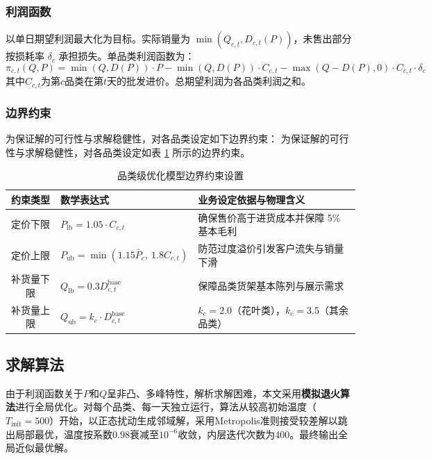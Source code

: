 \documentclass[withoutpreface]{cumcmthesis}
\begin{document}
\subsubsection{利润函数}

以单日期望利润最大化为目标。实际销量为 $\min(Q_{c,t}, D_{c,t}(P))$，未售出部分按损耗率 $\delta_c$ 承担损失。单品类利润函数为：
\begin{equation}
\pi_{c,t}(Q,P) = \min(Q,D(P))\cdot P - \min(Q,D(P))\cdot C_{c,t} - \max(Q-D(P),0)\cdot C_{c,t}\cdot\delta_c
\end{equation}
其中$C_{c,t}$为第$c$品类在第$t$天的批发进价。总期望利润为各品类利润之和。

\subsubsection{边界约束}

为保证解的可行性与求解稳健性，对各品类设定如下边界约束：
为保证解的可行性与求解稳健性，对各品类设定如表 \ref{tab:p2_bounds} 所示的边界约束。

\begin{table}[htbp]
\centering
\caption{品类级优化模型边界约束设置}
\label{tab:p2_bounds}
\begin{tabular}{c l l}
\toprule
\textbf{约束类型} & \textbf{数学表达式} & \textbf{业务设定依据与物理含义} \\
\midrule
定价下限 & $P_{\text{lb}} = 1.05 \cdot C_{c,t}$ & 确保售价高于进货成本并保障 5\% 基本毛利 \\
定价上限 & $P_{\text{ub}} = \min(1.15\bar{P}_c,\ 1.8C_{c,t})$ & 防范过度溢价引发客户流失与销量下滑 \\
补货量下限 & $Q_{\text{lb}} = 0.3 D_{c,t}^{\text{base}}$ & 保障品类货架基本陈列与展示需求 \\
补货量上限 & $Q_{\text{ub}} = k_c \cdot D_{c,t}^{\text{base}}$ & $k_c=2.0$（花叶类），$k_c=3.5$（其余品类） \\
\bottomrule
\end{tabular}
\end{table}


\subsection{求解算法}
由于利润函数关于$P$和$Q$呈非凸、多峰特性，解析求解困难，本文采用\textbf{模拟退火算法}进行全局优化。对每个品类、每一天独立运行，算法从较高初始温度（$T_{\text{init}}=500$）开始，以正态扰动生成邻域解，采用Metropolis准则接受较差解以跳出局部最优，温度按系数$0.98$衰减至$10^{-6}$收敛，内层迭代次数为400。最终输出全局近似最优解。
\end{document}

